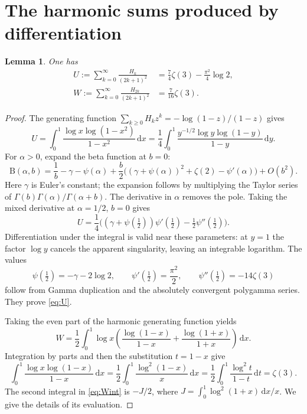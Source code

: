 \documentclass[11pt]{article}
\newtheorem{lemma}[theorem]{Lemma}
\newcommand{\dd}{\,\mathrm{d}}
\begin{document}
\section{The harmonic sums produced by differentiation}
\begin{lemma}\label{lem:Euler}
One has
\begin{align}
 U:=\sum_{k=0}^{\infty}\frac{H_k}{(2k+1)^2}
 &=\frac74\zeta(3)-\frac{\pi^2}{4}\log2,\label{eq:U}\\
 W:=\sum_{k=0}^{\infty}\frac{H_{2k}}{(2k+1)^2}
 &=\frac7{16}\zeta(3).\label{eq:W}
\end{align}
\end{lemma}
\begin{proof}
The generating function
$\sum_{k\geq0}H_kz^k=-\log(1-z)/(1-z)$ gives
\[
 U=\int_0^1\frac{\log x\log(1-x^2)}{1-x^2}\dd x
 =\frac14\int_0^1
 \frac{y^{-1/2}\log y\log(1-y)}{1-y}\dd y.
\]
For $\alpha>0$, expand the beta function at $b=0$:
\begin{equation}\label{eq:beta}
 \mathrm B(\alpha,b)=\frac1b-\gamma-\psi(\alpha)
 +\frac b2\bigl((\gamma+\psi(\alpha))^2+\zeta(2)-\psi'(\alpha)\bigr)
 +O(b^2).
\end{equation}
Here $\gamma$ is Euler's constant; the expansion follows by multiplying
the Taylor series of $\Gamma(b)\Gamma(\alpha)/\Gamma(\alpha+b)$.
The derivative in $\alpha$ removes the pole. Taking the mixed derivative
at $\alpha=1/2$, $b=0$ gives
\[
 U=\frac14\bigl((\gamma+\psi(\tfrac12))\psi'(\tfrac12)
 -\tfrac12\psi''(\tfrac12)\bigr).
\]
Differentiation under the integral is valid near these parameters:
at $y=1$ the factor $\log y$ cancels the apparent singularity, leaving
an integrable logarithm. The values
\[
 \psi(\tfrac12)=-\gamma-2\log2,\qquad
 \psi'(\tfrac12)=\frac{\pi^2}{2},\qquad
 \psi''(\tfrac12)=-14\zeta(3)
\]
follow from Gamma duplication and the absolutely convergent polygamma
series. They prove \eqref{eq:U}.

Taking the even part of the harmonic generating function yields
\begin{equation}\label{eq:Wint}
 W=\frac12\int_0^1\log x
 \left(\frac{\log(1-x)}{1-x}+\frac{\log(1+x)}{1+x}\right)\dd x.
\end{equation}
Integration by parts and then the substitution $t=1-x$ give
\[
 \int_0^1\frac{\log x\log(1-x)}{1-x}\dd x
 =\frac12\int_0^1\frac{\log^2(1-x)}x\dd x
 =\frac12\int_0^1\frac{\log^2t}{1-t}\dd t=\zeta(3).
\]
The second integral in \eqref{eq:Wint} is $-J/2$, where
$J=\int_0^1\log^2(1+x)\dd x/x$. We give the details of its evaluation.


\end{proof}
\end{document}
